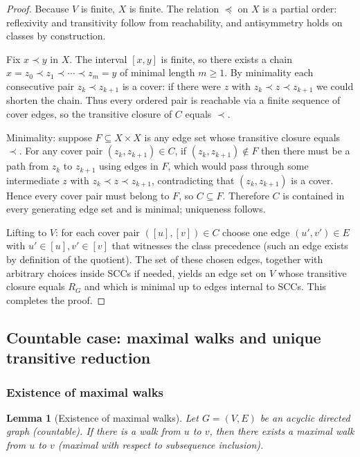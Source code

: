 \documentclass[11pt]{article}
\newtheorem{lemma}[definition]{Lemma}
\begin{document}
\begin{proof}
Because $V$ is finite, $X$ is finite. The relation $\preceq$ on $X$ is a
partial order: reflexivity and transitivity follow from reachability, and
antisymmetry holds on classes by construction.

Fix $x\prec y$ in $X$. The interval $[x,y]$ is finite, so there exists a
chain $x=z_0\prec z_1\prec\cdots\prec z_m=y$ of minimal length $m\ge1$.
By minimality each consecutive pair $z_k\prec z_{k+1}$ is a cover: if
there were $z$ with $z_k\prec z\prec z_{k+1}$ we could shorten the chain.
Thus every ordered pair is reachable via a finite sequence of cover edges,
so the transitive closure of $C$ equals $\prec$.

Minimality: suppose $F\subseteq X\times X$ is any edge set whose transitive
closure equals $\prec$. For any cover pair $(z_k,z_{k+1})\in C$, if
$(z_k,z_{k+1})\notin F$ then there must be a path from $z_k$ to $z_{k+1}$
using edges in $F$, which would pass through some intermediate $z$ with
$z_k\prec z\prec z_{k+1}$, contradicting that $(z_k,z_{k+1})$ is a cover.
Hence every cover pair must belong to $F$, so $C\subseteq F$. Therefore
$C$ is contained in every generating edge set and is minimal; uniqueness
follows.

Lifting to $V$: for each cover pair $([u],[v])\in C$ choose one edge
$(u',v')\in E$ with $u'\in[u], v'\in[v]$ that witnesses the class
precedence (such an edge exists by definition of the quotient). The set of
these chosen edges, together with arbitrary choices inside SCCs if needed,
yields an edge set on $V$ whose transitive closure equals $R_G$ and which
is minimal up to edges internal to SCCs. This completes the proof.
\end{proof}

\subsection*{Countable case: maximal walks and unique transitive reduction}
\subsubsection{Existence of maximal walks}
\begin{lemma}[Existence of maximal walks]
Let $G=(V,E)$ be an acyclic directed graph (countable). If there is a walk
from $u$ to $v$, then there exists a maximal walk from $u$ to $v$ (maximal
with respect to subsequence inclusion).
\end{lemma}
\end{document}
